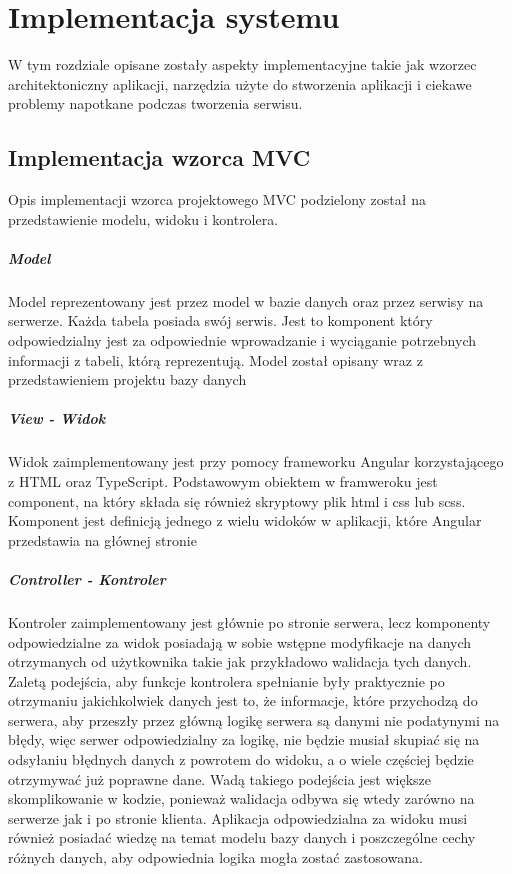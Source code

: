 \chapter{Implementacja systemu}
\thispagestyle{chapterBeginStyle}
W tym rozdziale opisane zostały aspekty implementacyjne takie jak wzorzec architektoniczny aplikacji, narzędzia użyte do stworzenia aplikacji  i ciekawe problemy napotkane podczas tworzenia serwisu.
\section{Implementacja  wzorca  MVC}
Opis implementacji wzorca projektowego MVC podzielony został na przedstawienie modelu, widoku i kontrolera.
\paragraph{Model}

Model reprezentowany jest przez model w bazie danych oraz przez serwisy na serwerze. 
 Każda tabela posiada swój serwis. Jest to komponent który odpowiedzialny jest za odpowiednie wprowadzanie i wyciąganie potrzebnych informacji z tabeli, którą reprezentują. Model został opisany wraz z przedstawieniem projektu bazy danych 
\paragraph{View - Widok}


Widok zaimplementowany jest przy pomocy frameworku Angular korzystającego z HTML oraz TypeScript. Podstawowym obiektem w framweroku jest component,  na który składa się również skryptowy plik html i css lub scss. Komponent jest definicją jednego z wielu widoków w aplikacji, które Angular przedstawia na głównej stronie 
\paragraph{Controller - Kontroler}


Kontroler zaimplementowany jest głównie po stronie serwera, lecz komponenty odpowiedzialne za widok posiadają w sobie wstępne modyfikacje na danych otrzymanych od użytkownika takie jak przykładowo walidacja tych danych. Zaletą podejścia, aby funkcje kontrolera spełnianie były praktycznie po otrzymaniu jakichkolwiek danych jest to, że informacje, które przychodzą do serwera, aby przeszły przez główną logikę serwera są danymi nie podatynymi na błędy, więc serwer odpowiedzialny za logikę, nie będzie musiał skupiać się na odsyłaniu błędnych danych z powrotem do widoku, a o wiele częściej będzie otrzymywać już poprawne dane. Wadą takiego podejścia jest większe skomplikowanie w kodzie, ponieważ walidacja odbywa się wtedy zarówno na serwerze jak i po stronie klienta. Aplikacja odpowiedzialna za widoku musi również posiadać wiedzę na temat modelu bazy danych i poszczególne cechy różnych danych, aby odpowiednia logika mogła zostać zastosowana.


